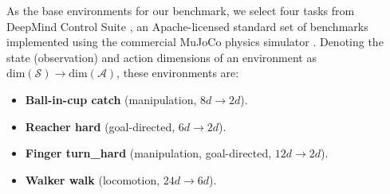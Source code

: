 \begin{subappendices}
As the base environments for our benchmark, we select four tasks from DeepMind Control Suite \citep{tassa2018deepmind}, an Apache-licensed standard set of benchmarks implemented using the commercial MuJoCo physics simulator \citep{todorov2012mujoco}.
Denoting the state (observation) and action dimensions of an environment as $\text{dim}(\mathcal{S}) \rightarrow \text{dim}(\mathcal{A})$, these environments are:
\begin{itemize}
    \item \textbf{Ball-in-cup catch} (manipulation, $8d \rightarrow 2d$).
    \item \textbf{Reacher hard} (goal-directed, $6d \rightarrow 2d$).
    \item \textbf{Finger turn\_hard} (manipulation, goal-directed, $12d \rightarrow 2d$).
    \item \textbf{Walker walk} (locomotion, $24d \rightarrow 6d$).
\end{itemize}


\end{subappendices}
